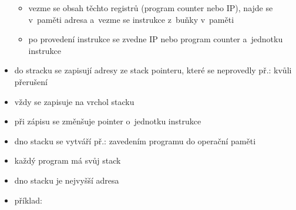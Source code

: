 \documentclass[a4paper,12pt]{article}
\providecommand{\tightlist}{%
\setlength{\itemsep}{0pt}\setlength{\parskip}{0pt}}
\begin{document}
\begin{itemize}
    \begin{itemize}
    \tightlist
    \item vezme se obsah těchto registrů (program counter nebo IP), najde se
    v~paměti adresa a~vezme se instrukce z~buňky v~paměti
    \item po provedení instrukce se zvedne IP nebo program counter a~jednotku
    instrukce
    \end{itemize}
  \item do stracku se zapisují adresy ze stack pointeru, které se neprovedly
    př.: kvůli přerušení
  \item vždy se zapisuje na vrchol stacku
  \item při zápisu se změnšuje pointer o~jednotku instrukce
  \item dno stacku se vytváří př.: zavedením programu do operační paměti
  \item každý program má svůj stack
  \item dno stacku je nejvyšší adresa
  \item příklad:
\end{itemize}
\end{document}
